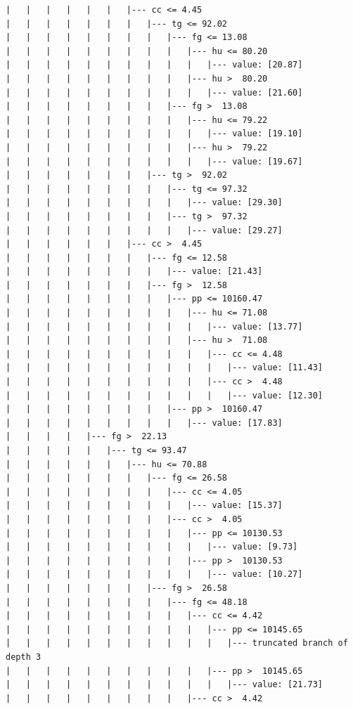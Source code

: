 \documentclass[UTF8, a4paper]{ctexart}
\begin{document}
\begin{lstlisting}
|   |   |   |   |   |   |--- cc <= 4.45
|   |   |   |   |   |   |   |--- tg <= 92.02
|   |   |   |   |   |   |   |   |--- fg <= 13.08
|   |   |   |   |   |   |   |   |   |--- hu <= 80.20
|   |   |   |   |   |   |   |   |   |   |--- value: [20.87]
|   |   |   |   |   |   |   |   |   |--- hu >  80.20
|   |   |   |   |   |   |   |   |   |   |--- value: [21.60]
|   |   |   |   |   |   |   |   |--- fg >  13.08
|   |   |   |   |   |   |   |   |   |--- hu <= 79.22
|   |   |   |   |   |   |   |   |   |   |--- value: [19.10]
|   |   |   |   |   |   |   |   |   |--- hu >  79.22
|   |   |   |   |   |   |   |   |   |   |--- value: [19.67]
|   |   |   |   |   |   |   |--- tg >  92.02
|   |   |   |   |   |   |   |   |--- tg <= 97.32
|   |   |   |   |   |   |   |   |   |--- value: [29.30]
|   |   |   |   |   |   |   |   |--- tg >  97.32
|   |   |   |   |   |   |   |   |   |--- value: [29.27]
|   |   |   |   |   |   |--- cc >  4.45
|   |   |   |   |   |   |   |--- fg <= 12.58
|   |   |   |   |   |   |   |   |--- value: [21.43]
|   |   |   |   |   |   |   |--- fg >  12.58
|   |   |   |   |   |   |   |   |--- pp <= 10160.47
|   |   |   |   |   |   |   |   |   |--- hu <= 71.08
|   |   |   |   |   |   |   |   |   |   |--- value: [13.77]
|   |   |   |   |   |   |   |   |   |--- hu >  71.08
|   |   |   |   |   |   |   |   |   |   |--- cc <= 4.48
|   |   |   |   |   |   |   |   |   |   |   |--- value: [11.43]
|   |   |   |   |   |   |   |   |   |   |--- cc >  4.48
|   |   |   |   |   |   |   |   |   |   |   |--- value: [12.30]
|   |   |   |   |   |   |   |   |--- pp >  10160.47
|   |   |   |   |   |   |   |   |   |--- value: [17.83]
|   |   |   |   |--- fg >  22.13
|   |   |   |   |   |--- tg <= 93.47
|   |   |   |   |   |   |--- hu <= 70.88
|   |   |   |   |   |   |   |--- fg <= 26.58
|   |   |   |   |   |   |   |   |--- cc <= 4.05
|   |   |   |   |   |   |   |   |   |--- value: [15.37]
|   |   |   |   |   |   |   |   |--- cc >  4.05
|   |   |   |   |   |   |   |   |   |--- pp <= 10130.53
|   |   |   |   |   |   |   |   |   |   |--- value: [9.73]
|   |   |   |   |   |   |   |   |   |--- pp >  10130.53
|   |   |   |   |   |   |   |   |   |   |--- value: [10.27]
|   |   |   |   |   |   |   |--- fg >  26.58
|   |   |   |   |   |   |   |   |--- fg <= 48.18
|   |   |   |   |   |   |   |   |   |--- cc <= 4.42
|   |   |   |   |   |   |   |   |   |   |--- pp <= 10145.65
|   |   |   |   |   |   |   |   |   |   |   |--- truncated branch of depth 3
|   |   |   |   |   |   |   |   |   |   |--- pp >  10145.65
|   |   |   |   |   |   |   |   |   |   |   |--- value: [21.73]
|   |   |   |   |   |   |   |   |   |--- cc >  4.42

\end{lstlisting}
\end{document}

